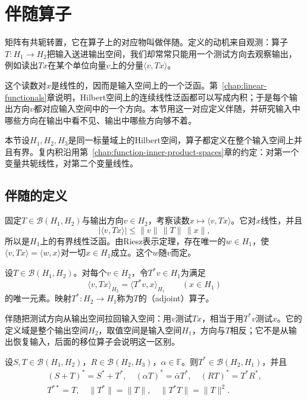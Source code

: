 \section{伴随算子}
\label{sec:lop-adjoint}

矩阵有共轭转置，它在算子上的对应物叫做伴随。定义的动机来自观测：算子$T:H_1\to H_2$把输入送进输出空间，我们却常常只能用一个测试方向去观察输出，例如读出$Tx$在某个单位向量$v$上的分量$\langle v,Tx\rangle$。

这个读数对$x$是线性的，因而是输入空间上的一个泛函。第~\ref{chap:linear-functionals}章说明，Hilbert空间上的连续线性泛函都可以写成内积；于是每个输出方向$v$都对应输入空间中的一个方向。本节用这一对应定义伴随，并研究输入中哪些方向在输出中看不见、输出中哪些方向够不着。

本节设$H_1,H_2,H_3$是同一标量域上的Hilbert空间，算子都定义在整个输入空间上并且有界。复内积沿用第~\ref{chap:function-inner-product-spaces}章的约定：对第一个变量共轭线性，对第二个变量线性。

\subsection{伴随的定义}
\label{sec:lop-adjoint-def}

固定$T\in\mathcal B(H_1,H_2)$与输出方向$v\in H_2$，考察读数$x\mapsto\langle v,Tx\rangle$。它对$x$线性，并且
\[
 \lvert\langle v,Tx\rangle\rvert\leq\lVert v\rVert\,\lVert T\rVert\,\lVert x\rVert,
\]
所以是$H_1$上的有界线性泛函。由Riesz表示定理，存在唯一的$w\in H_1$，使$\langle v,Tx\rangle=\langle w,x\rangle$对一切$x\in H_1$成立。这个$w$随$v$而定。

\begin{definition}[伴随算子]
\label{def:lop-adjoint}
设$T\in\mathcal B(H_1,H_2)$。对每个$v\in H_2$，令$T^*v\in H_1$为满足
\begin{equation}
 \langle v,Tx\rangle_{H_2}=\langle T^*v,x\rangle_{H_1}\qquad(x\in H_1)
 \label{eq:lop-adjoint}
\end{equation}
的唯一元素。映射$T^*:H_2\to H_1$称为$T$的（adjoint）算子。
\end{definition}

伴随把测试方向从输出空间拉回输入空间：用$v$测试$Tx$，相当于用$T^*v$测试$x$。它的定义域是整个输出空间$H_2$，取值空间是输入空间$H_1$，方向与$T$相反；它不是从输出恢复输入，后面的移位算子会说明这一区别。

\begin{theorem}[伴随的基本性质]
\label{thm:lop-adjoint-properties}
设$S,T\in\mathcal B(H_1,H_2)$，$R\in\mathcal B(H_2,H_3)$，$\alpha\in\mathbb F$。则$T^*\in\mathcal B(H_2,H_1)$，并且
\begin{equation}
 \begin{gathered}
 (S+T)^*=S^*+T^*,\quad(\alpha T)^*=\bar\alpha T^*,\quad(RT)^*=T^*R^*,\\
 T^{**}=T,\quad\lVert T^*\rVert=\lVert T\rVert,\quad\lVert T^*T\rVert=\lVert T\rVert^2 .
 \end{gathered}
 \label{eq:lop-adjoint-properties}
\end{equation}
\end{theorem}

